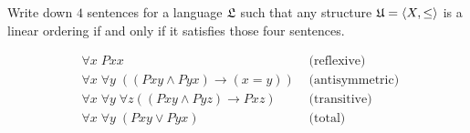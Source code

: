 \begin{problem}[7]
  Write down $4$ sentences for a language $\mathfrak{L}$ such that
  any structure $\mathfrak{U} = \langle X, \le \rangle$
  is a linear ordering if and only if it satisfies those four sentences.

  \begin{Answer}
    \begin{align*}
      &\forall x\; Pxx &\text{ (reflexive) }\\
      &\forall x\; \forall y\; \left( (Pxy \land Pyx) \to (x = y) \right) &\text{ (antisymmetric) }\\
      &\forall x\; \forall y\; \forall z \left( (Pxy \land Pyz) \to Pxz \right) &\text{ (transitive) } \\
      &\forall x\; \forall y\; \left( Pxy \lor Pyx \right) &\text{ (total) }\\
    \end{align*}
  \end{Answer}
\end{problem}

